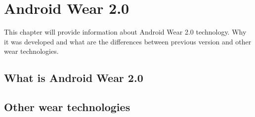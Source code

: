 \chapter{Android Wear 2.0}\label{sec:AndroidWear2}
This chapter will provide information about Android Wear 2.0 technology. Why it was developed and what are the differences between previous version and other wear technologies.

\section{What is Android Wear 2.0}\label{sec:WhatIsAndroidWear2}

\section{Other wear technologies}\label{sec:OtherWearTechnologies}